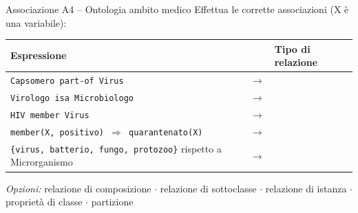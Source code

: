 \documentclass[12pt,a4paper]{article}
\begin{document}
\begin{assocbox}{Associazione A4 -- Ontologia ambito medico}
Effettua le corrette associazioni (X è una variabile):

\begin{center}
\renewcommand{\arraystretch}{1.5}
\begin{tabular}{lll}
\textbf{Espressione} & & \textbf{Tipo di relazione} \\
\hline
\texttt{Capsomero part-of Virus} & $\longrightarrow$ & \underline{\hspace{4cm}} \\
\texttt{Virologo isa Microbiologo} & $\longrightarrow$ & \underline{\hspace{4cm}} \\
\texttt{HIV member Virus} & $\longrightarrow$ & \underline{\hspace{4cm}} \\
\texttt{member(X, positivo) $\Rightarrow$ quarantenato(X)} & $\longrightarrow$ & \underline{\hspace{4cm}} \\
\texttt{\{virus, batterio, fungo, protozoo\}} rispetto a Microrganismo & $\longrightarrow$ & \underline{\hspace{4cm}} \\
\end{tabular}
\end{center}

\smallskip
\textit{Opzioni:} relazione di composizione $\cdot$ relazione di sottoclasse $\cdot$ relazione di istanza $\cdot$ proprietà di classe $\cdot$ partizione
\end{assocbox}
\end{document}
